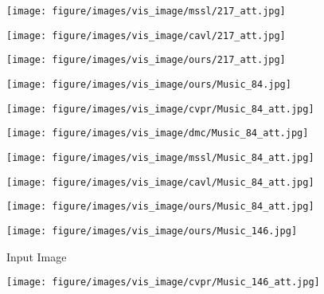 \begin{figure*}[t!]
    \begin{subfigure}[b]{.16\linewidth}
    \centering
    \texttt{[image: figure/images/vis\_image/mssl/217\_att.jpg]}
    \end{subfigure}
    \begin{subfigure}[b]{.16\linewidth}
    \centering
    \texttt{[image: figure/images/vis\_image/cavl/217\_att.jpg]}
    \end{subfigure}
    \begin{subfigure}[b]{.16\linewidth}
    \centering
    \texttt{[image: figure/images/vis\_image/ours/217\_att.jpg]}
    \end{subfigure}
    \fi
    \begin{subfigure}[b]{.16\linewidth}
    \centering
    \texttt{[image: figure/images/vis\_image/ours/Music\_84.jpg]}
    \end{subfigure}
    \begin{subfigure}[b]{.16\linewidth}
    \centering
    \texttt{[image: figure/images/vis\_image/cvpr/Music\_84\_att.jpg]}
    \end{subfigure}
    \begin{subfigure}[b]{.16\linewidth}
    \centering
    \texttt{[image: figure/images/vis\_image/dmc/Music\_84\_att.jpg]}
    \end{subfigure}  
    \begin{subfigure}[b]{.16\linewidth}
    \centering
    \texttt{[image: figure/images/vis\_image/mssl/Music\_84\_att.jpg]}
    \end{subfigure}
    \begin{subfigure}[b]{.16\linewidth}
    \centering
    \texttt{[image: figure/images/vis\_image/cavl/Music\_84\_att.jpg]}
    \end{subfigure}
    \begin{subfigure}[b]{.16\linewidth}
    \centering
    \texttt{[image: figure/images/vis\_image/ours/Music\_84\_att.jpg]}
    \end{subfigure}
    \begin{subfigure}[b]{.16\linewidth}
    \centering
    \texttt{[image: figure/images/vis\_image/ours/Music\_146.jpg]}
    \caption{Input Image}
    \end{subfigure}
    \begin{subfigure}[b]{.16\linewidth}
    \centering
    \texttt{[image: figure/images/vis\_image/cvpr/Music\_146\_att.jpg]}

\end{subfigure}
\end{figure*}

